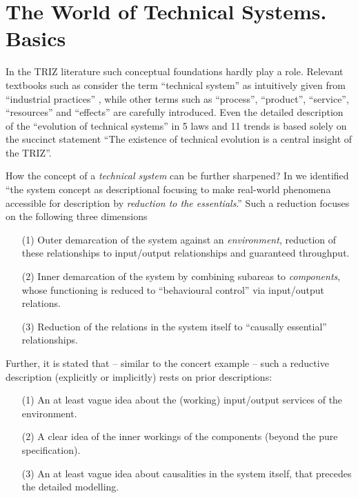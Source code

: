 \documentclass{llncs}
\begin{document}
\section{The World of Technical Systems. Basics}

In the TRIZ literature such conceptual foundations hardly play a role.
Relevant textbooks such as \cite{KS2017} consider the term ``technical
system'' as intuitively given from ``industrial practices'' \cite
[p. 2]{KS2017}, while other terms such as ``process'', ``product'',
``service'', ``resources'' and ``effects'' \cite[p. 6--10]{KS2017} are
carefully introduced. Even the detailed description of the ``evolution of
technical systems'' in 5 laws and 11 trends \cite[Section 4.8]{KS2017} is
based solely on the succinct statement ``The existence of technical evolution
is a central insight of the TRIZ''. 

How the concept of a \emph{technical system} can be further sharpened?  In
\cite{Graebe2020a} we identified ``the system concept as descriptional
focusing to make real-world phenomena accessible for description by
\emph{reduction to the essentials}.'' Such a reduction focuses on the
following three dimensions \cite[p. 18]{Graebe2020a}
\begin{itemize}
\item [(1)] Outer demarcation of the system against an \emph{environment},
  reduction of these relationships to input/output relationships and
  guaranteed throughput.
\item [(2)] Inner demarcation of the system by combining subareas to
  \emph{components}, whose functioning is reduced to ``behavioural control''
  via input/output relations.
\item [(3)] Reduction of the relations in the system itself to ``causally
  essential'' relationships.
\end{itemize}
Further, it is stated that -- similar to the concert example -- such a
reductive description (explicitly or implicitly) rests on prior descriptions:
\begin{enumerate}
\item[(1)] An at least vague idea about the (working) input/output services of
  the environment.
\item[(2)] A clear idea of the inner workings of the components (beyond the
  pure specification).
\item[(3)] An at least vague idea about causalities in the system itself, that
  precedes the detailed modelling.
\end{enumerate}
\end{document}

